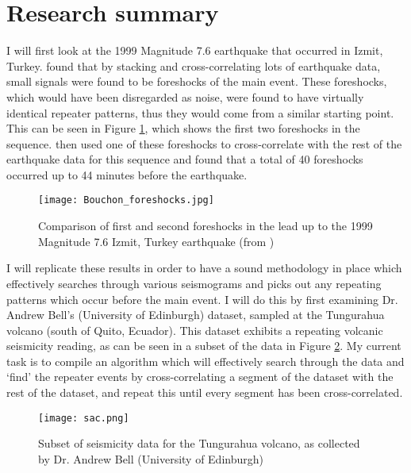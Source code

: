 \documentclass[12pt]{report}
\begin{document}
\section{Research summary}
I will first look at the 1999 Magnitude 7.6 earthquake that occurred in Izmit, Turkey. \citet{Bouchon2011} found that by stacking and cross-correlating lots of earthquake data, small signals were found to be foreshocks of the main event. These foreshocks, which would have been disregarded as noise, were found to have virtually identical repeater patterns, thus they would come from a similar starting point. This can be seen in Figure \ref{Bouchon_foreshocks}, which shows the first two foreshocks in the sequence. \cite{Bouchon2011} then used one of these foreshocks to cross-correlate with the rest of the earthquake data for this sequence and found that a total of 40 foreshocks occurred up to 44 minutes before the earthquake.  

\begin{center}
	\begin{figure}[h]
		\centering
		\texttt{[image: Bouchon\_foreshocks.jpg]}
		\caption{Comparison of first and second foreshocks in the lead up to the 1999 Magnitude 7.6 Izmit, Turkey earthquake (from \cite{Bouchon2011})}
		\label{Bouchon_foreshocks}
	\end{figure}
\end{center}

\FloatBarrier

I will replicate these results in order to have a sound methodology in place which effectively searches through various seismograms and picks out any repeating patterns which occur before the main event. I will do this by first examining Dr. Andrew Bell's (University of Edinburgh) dataset, sampled at the Tungurahua volcano (south of Quito, Ecuador). This dataset exhibits a repeating volcanic seismicity reading, as can be seen in a subset of the data in Figure \ref{volcano_rep}. My current task is to compile an algorithm which will effectively search through the data and `find' the repeater events by cross-correlating a segment of the dataset with the rest of the dataset, and repeat this until every segment has been cross-correlated. 

\begin{figure}[h]
	\centering
	\texttt{[image: sac.png]}
	\caption{Subset of seismicity data for the Tungurahua volcano, as collected by Dr. Andrew Bell (University of Edinburgh)}
	\label{volcano_rep}
\end{figure}
\end{document}
